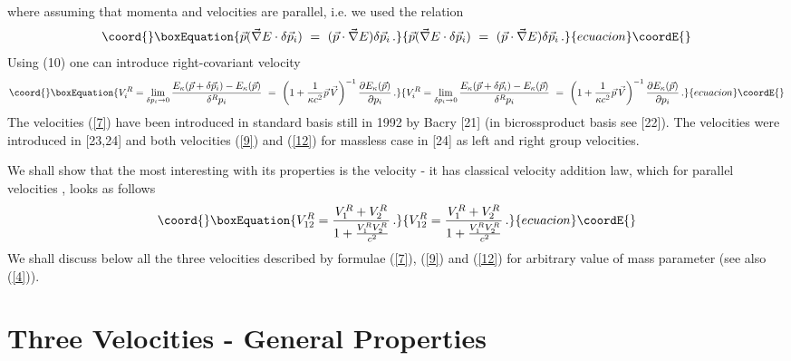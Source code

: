 \documentclass[a4paper,12pt]{article}
\begin{document}
where assuming that momenta and velocities are parallel, i.e.
\coordHE{} we used the
relation
\begin{equation}\coord{}\boxEquation{\label{11}\vec{p} (\vec{\nabla}E\cdot
\delta \vec{p}_i) \ = \ (\vec{p}\cdot \vec{\nabla}E)\delta
\vec{p}_i\, .
}{\vec{p} (\vec{\nabla}E\cdot
\delta \vec{p}_i) \ = \ (\vec{p}\cdot \vec{\nabla}E)\delta
\vec{p}_i\, .
}{ecuacion}\coordE{}\end{equation}
Using (10) one can introduce right-covariant velocity
\begin{equation}\coord{}\boxEquation{\label{12} V_i^{R} =
\lim\limits_{\delta  p_i \to 0} \frac{E_\kappa(\vec{p}+ \delta
\vec{p}_i) - E_\kappa(\vec{p})}{\delta^R p_i} \ = \ \left(1 +
\frac{1}{\kappa c^2}\vec{p}{\,} \vec{V}\right)^{-1}\frac{\partial
E_\kappa ( \vec{p})}{\partial p_i}\, .
}{V_i^{R} =
\lim\limits_{\delta  p_i \to 0} \frac{E_\kappa(\vec{p}+ \delta
\vec{p}_i) - E_\kappa(\vec{p})}{\delta^R p_i} \ = \ \left(1 +
\frac{1}{\kappa c^2}\vec{p}{\,} \vec{V}\right)^{-1}\frac{\partial
E_\kappa ( \vec{p})}{\partial p_i}\, .
}{ecuacion}\coordE{}\end{equation}
The velocities (\ref{7}) have been introduced in standard basis
still in 1992 by Bacry [21] (in bicrossproduct basis see [22]).
The velocities \coordHE{} were introduced  in [23,24] and both
velocities (\ref{9}) and (\ref{12}) for massless case in [24] as
left and right group  velocities.

We shall show that the most interesting with its properties is the
velocity \coordHE{} - it has classical velocity addition law, which
for parallel velocities \coordHE{}, \coordHE{} looks as
follows
\begin{equation}\coord{}\boxEquation{\label{13}
V^{R}_{12}=  \frac{V^{R}_{1}+ V^{R}_{2}}{1 +
\frac{V^{R}_{1}V^{R}_{2}}{c^2}}\, .
}{V^{R}_{12}=  \frac{V^{R}_{1}+ V^{R}_{2}}{1 +
\frac{V^{R}_{1}V^{R}_{2}}{c^2}}\, .
}{ecuacion}\coordE{}\end{equation}
We shall discuss below all the three velocities described by
formulae (\ref{7}), (\ref{9}) and (\ref{12}) for arbitrary value
of mass parameter \coordHE{} (see also (\ref{4})).

\section{Three Velocities - General Properties}
\end{document}
